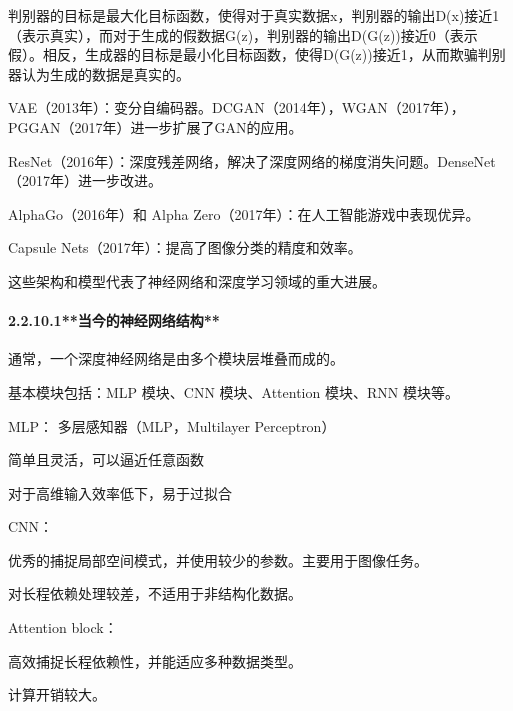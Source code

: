 
判别器的目标是最大化目标函数，使得对于真实数据x，判别器的输出D(x)接近1（表示真实），而对于生成的假数据G(z)，判别器的输出D(G(z))接近0（表示假）。相反，生成器的目标是最小化目标函数，使得D(G(z))接近1，从而欺骗判别器认为生成的数据是真实的。

VAE（2013年）：变分自编码器。DCGAN（2014年），WGAN（2017年），PGGAN（2017年）进一步扩展了GAN的应用。

ResNet（2016年）：深度残差网络，解决了深度网络的梯度消失问题。DenseNet（2017年）进一步改进。

AlphaGo（2016年）和 Alpha Zero（2017年）：在人工智能游戏中表现优异。

Capsule Nets（2017年）：提高了图像分类的精度和效率。

这些架构和模型代表了神经网络和深度学习领域的重大进展。

\paragraph{\texorpdfstring{\textbf{2.2.10.1*}*当今的神经网络结构**}{2.2.10.1**当今的神经网络结构**}}\label{22101ux5f53ux4ecaux7684ux795eux7ecfux7f51ux7edcux7ed3ux6784}

通常，一个深度神经网络是由多个模块层堆叠而成的。

基本模块包括：MLP 模块、CNN 模块、Attention 模块、RNN 模块等。


MLP： 多层感知器（MLP，Multilayer Perceptron）

简单且灵活，可以逼近任意函数

对于高维输入效率低下，易于过拟合

CNN：

优秀的捕捉局部空间模式，并使用较少的参数。主要用于图像任务。

对长程依赖处理较差，不适用于非结构化数据。

Attention block：

高效捕捉长程依赖性，并能适应多种数据类型。

计算开销较大。


